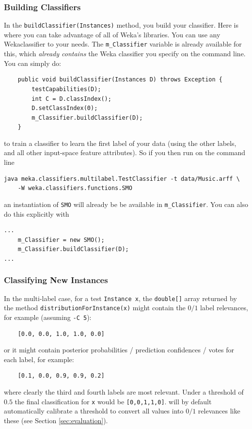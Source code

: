 \documentclass[11pt]{article}
\newcommand{\MEKA}{Meka}
\newcommand{\WEKA}{Weka}
\begin{document}
\subsubsection{Building Classifiers}

In the \texttt{buildClassifier(Instances)} method, you build your classifier. Here is where you can take advantage of all of \WEKA's libraries. You can use any \WEKA classifier to your needs. The \texttt{m\_Classifier} variable is already available for this, which \textit{already contains} the \WEKA{} classifier you specify on the command line. You can simply do:
{
\lstset{basicstyle=\small\ttfamily,breaklines=true,language=java,frame=L,xleftmargin=\parindent}
\begin{lstlisting}
    public void buildClassifier(Instances D) throws Exception {
        testCapabilities(D);
        int C = D.classIndex();
        D.setClassIndex(0);
        m_Classifier.buildClassifier(D);
    }
\end{lstlisting}
}
to train a classifier to learn the first label of your data (using the other labels, and all other input-space feature attributes). So if you then run on the command line
{
\lstset{basicstyle=\small\ttfamily,breaklines=true,language=java,frame=L,xleftmargin=\parindent}
\begin{lstlisting}
java meka.classifiers.multilabel.TestClassifier -t data/Music.arff \
	-W weka.classifiers.functions.SMO
\end{lstlisting}
}
an instantiation of \texttt{SMO} will already be be available in \texttt{m\_Classifier}. You can also do this explicitly with
{
\lstset{basicstyle=\small\ttfamily,breaklines=true,language=java,frame=L,xleftmargin=\parindent}
\begin{lstlisting}
...
    m_Classifier = new SMO();
    m_Classifier.buildClassifier(D);
...
\end{lstlisting}
}

\subsubsection{Classifying New Instances}

In the multi-label case, for a test \texttt{Instance x}, the \texttt{double[]} array returned by the method \texttt{distributionForInstance(x)} might contain the $0/1$ label relevances, for example (assuming \texttt{-C 5}):
\begin{lstlisting}
	[0.0, 0.0, 1.0, 1.0, 0.0]
\end{lstlisting} 
or it might contain posterior probabilities / prediction confidences / votes for each label, for example:
\begin{lstlisting}
	[0.1, 0.0, 0.9, 0.9, 0.2]
\end{lstlisting} 
where clearly the third and fourth labels are most relevant. Under a threshold of $0.5$ the final classification for \texttt{x} would be \texttt{[0,0,1,1,0]}. \framework{\MEKA} will by default automatically calibrate a threshold to convert all values into $0/1$ relevances like these (see Section \ref{sec:evaluation}). 
\end{document}
